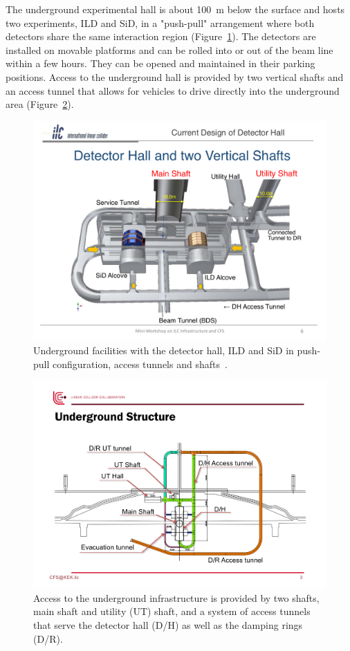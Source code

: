 The underground experimental hall is about 100~m below the surface and hosts two experiments, ILD and SiD, in a "push-pull" arrangement where both detectors share the same interaction region (Figure~\ref{fig:integration:underground}). The detectors are installed on movable platforms and can be rolled into or out of the beam line within a few hours. They can be opened and maintained in their parking positions. Access to the underground hall is provided by two vertical shafts and an access tunnel that allows for vehicles to drive directly into the underground area (Figure~\ref{fig:integration:access}).

\begin{figure}[h!]
\includegraphics[width=0.75\hsize]{Integration/fig/Underground_Facilities.pdf}
\caption{\label{fig:integration:underground}Underground facilities with the detector hall, ILD and SiD in push-pull configuration, access tunnels and shafts~\cite{ild:bib:underground_facilities}. }
\end{figure}


\begin{figure}[h!]
\includegraphics[width=0.9\hsize]{Integration/fig/Access.pdf}
\caption{\label{fig:integration:access}Access to the underground infrastructure is provided by two shafts, main shaft and utility (UT) shaft, and a system of access tunnels~\cite{ild:bib:Access} that serve the detector hall (D/H) as well as the damping rings (D/R). }
\end{figure}

